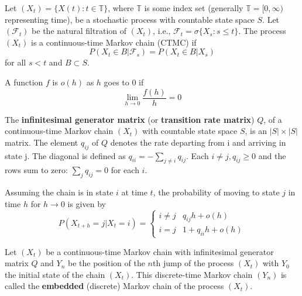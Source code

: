 \begin{defn} \cite{schapira2017}
Let $(X_t) = \{X(t) : t \in \mathbb T\}$, where $\mathbb T$ is some index set (generally $\mathbb T = [0, \infty)$ representing time), be a stochastic process with countable state space $S$.
Let $(\mathscr{F}_t)$ be the natural filtration of $(X_t)$, i.e., $\mathscr{F}_t = \sigma\{ X_s : s \leq t \}$.
The process $(X_t)$ is a continuous-time Markov chain (CTMC) if
$$
P(X_{t} \in B | \mathscr{F}_s) = P(X_{t} \in B | X_s)
$$
for all $s < t$ and $B \subset S$.

\end{defn}

\begin{defn}
A function $f$ is $o(h)$ as $h$ goes to 0 if 
$$
\lim_{h \to 0} \frac{f(h)}{h} = 0
$$
\end{defn}

\begin{defn}
The \textbf{infinitesimal generator matrix} (or \textbf{transition rate matrix}) $Q$, of a continuous-time Markov chain $(X_t)$ with countable state space $S$, is an $|S| \times |S|$ matrix.
The element $q_{ij}$ of $Q$ denotes the rate departing from i and arriving in state j.
The diagonal is defined as $q_{ii} = - \sum_{j \not = i} q_{ij}$.
Each $i \not = j, q_{ij} \geq 0$ and the rows sum to zero: $\sum_{j} q_{ij} = 0$ for each $i$.

Assuming the chain is in state $i$ at time $t$, the probability of moving to state $j$ in time $h$ for $h \to 0$ is given by
$$
P(X_{t + h} = j | X_{t} = i) = \begin{cases}
    i \not = j & q_{ij} h + o(h)\\
    i = j & 1 + q_{ii} h + o(h)
\end{cases}
$$
\end{defn}

\begin{defn}
Let $(X_t)$ be a continuous-time Markov chain with infinitesimal generator matrix $Q$ and $Y_n$ be the position of the $n$th jump of the process $(X_t)$ with $Y_0$ the initial state of the chain $(X_t)$.
This discrete-time Markov chain $(Y_n)$ is called the \textbf{embedded} (discrete) Markov chain of the process $(X_t)$.
\end{defn}

